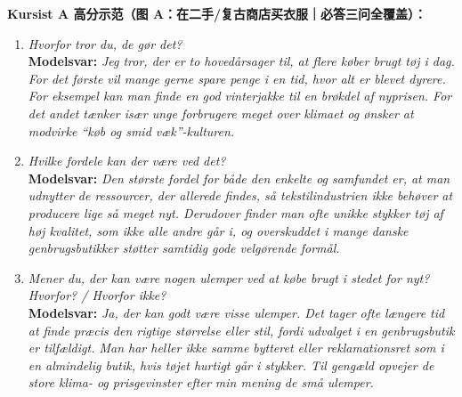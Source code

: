 \begin{answerbox}
\textbf{\color{NCDNavy}Kursist A 高分示范（图 A：在二手/复古商店买衣服｜必答三问全覆盖）：}
\begin{enumerate}[leftmargin=1.5em, itemsep=0.2em]
  \item \textit{Hvorfor tror du, de gør det?}\\
  \textbf{Modelsvar:} \textit{Jeg tror, der er to hovedårsager  til, at flere køber brugt tøj i dag. For det første vil mange gerne spare penge i en tid, hvor alt er blevet dyrere. For eksempel kan man finde en god vinterjakke til en brøkdel af nyprisen. For det andet tænker især unge forbrugere meget over klimaet og ønsker at modvirke “køb og smid væk”-kulturen.}
  \item \textit{Hvilke fordele kan der være ved det?}\\
  \textbf{Modelsvar:} \textit{Den største fordel for både den enkelte og samfundet er, at man udnytter de ressourcer, der allerede findes, så tekstilindustrien ikke behøver at producere lige så meget nyt. Derudover finder man ofte unikke stykker tøj af høj kvalitet, som ikke alle andre går i, og overskuddet i mange danske genbrugsbutikker støtter samtidig gode velgørende formål.}
  \item \textit{Mener du, der kan være nogen ulemper ved at købe brugt i stedet for nyt? Hvorfor? / Hvorfor ikke?}\\
  \textbf{Modelsvar:} \textit{Ja, der kan godt være visse ulemper. Det tager ofte længere tid at finde præcis den rigtige størrelse eller stil, fordi udvalget i en genbrugsbutik er tilfældigt. Man har heller ikke samme bytteret eller reklamationsret som i en almindelig butik, hvis tøjet hurtigt går i stykker. Til gengæld opvejer de store klima- og prisgevinster efter min mening de små ulemper.}
\end{enumerate}


\end{answerbox}
